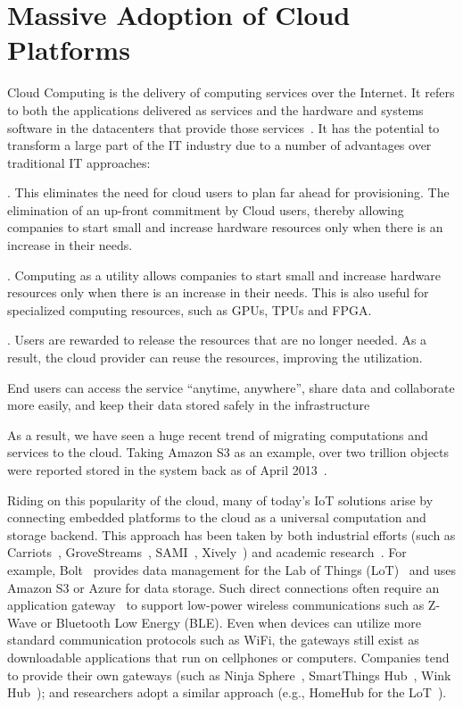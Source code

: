 \section{Massive Adoption of Cloud Platforms}
\label{sec:cloud}

Cloud Computing is the delivery of computing services over the Internet. It
refers to both the applications delivered as services and the hardware and
systems software in the datacenters that provide those
services~\cite{armbrust2010view}. It has the potential to transform a large part
of the IT industry due to a number of advantages over traditional IT approaches:


. This
eliminates the need for cloud users to plan far ahead for provisioning. The
elimination of an up-front commitment by Cloud users, thereby allowing companies
to start small and increase hardware resources only when there is an increase in
their needs.

. Computing as a utility allows companies to start small and
increase hardware resources only when there is an increase in their needs. This
is also useful for specialized computing resources, such as GPUs, TPUs and FPGA.

.  Users are
rewarded to release the resources that are no longer needed. As a result, the
cloud provider can reuse the resources, improving the utilization.

 End users can access
the service ``anytime, anywhere'', share data and collaborate more easily, and
keep their data stored safely in the infrastructure

As a result, we have seen a huge recent trend of migrating computations and
services to the cloud.  Taking Amazon S3 as an example, over two trillion
objects were reported stored in the system back as of April
2013~\cite{barr2013amazon}.

Riding on this popularity of the cloud, many of today's IoT solutions arise by
connecting embedded platforms to the cloud as a universal computation and
storage backend. This approach has been taken by both industrial efforts (such
as Carriots~\cite{carriots}, GroveStreams~\cite{grovestreams}, SAMI~\cite{sami},
Xively~\cite{xively}) and academic research~\cite{gupta2014bolt,
  zachariah1001internet}. For example, Bolt~\cite{gupta2014bolt} provides data
management for the Lab of Things (LoT)~\cite{brush2013lab} and uses Amazon S3 or
Azure for data storage. Such direct connections often require an application
gateway~\cite{zachariah1001internet} to support low-power wireless
communications such as Z-Wave or Bluetooth Low Energy (BLE).  Even when devices
can utilize more standard communication protocols such as WiFi, the gateways
still exist as downloadable applications that run on cellphones or computers.
Companies tend to provide their own gateways (such as Ninja Sphere~\cite{ninja},
SmartThings Hub~\cite{smartthings}, Wink Hub~\cite{wink}); and researchers adopt
a similar approach (e.g., HomeHub for the LoT~\cite{brush2013lab}).

